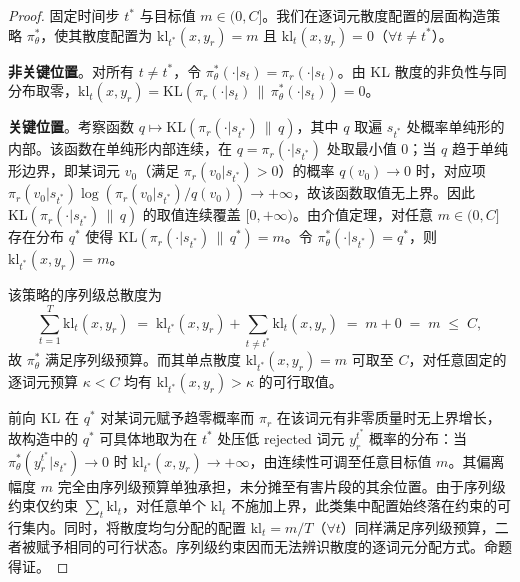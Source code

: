 \documentclass[lettersize,journal]{IEEEtran}
\begin{document}
\begin{proof}
固定时间步 $t^*$ 与目标值 $m \in (0, C]$。我们在逐词元散度配置的层面构造策略 $\pi_\theta^*$，使其散度配置为 $\mathrm{kl}_{t^*}(x, y_r) = m$ 且 $\mathrm{kl}_t(x, y_r) = 0$（$\forall t \neq t^*$）。
 
\textbf{非关键位置}。对所有 $t \neq t^*$，令 $\pi_\theta^*(\cdot|s_t) = \pi_r(\cdot|s_t)$。由 KL 散度的非负性与同分布取零，$\mathrm{kl}_t(x, y_r) = \mathrm{KL}(\pi_r(\cdot|s_t) \,\|\, \pi_\theta^*(\cdot|s_t)) = 0$。
 
\textbf{关键位置}。考察函数 $q \mapsto \mathrm{KL}(\pi_r(\cdot|s_{t^*}) \,\|\, q)$，其中 $q$ 取遍 $s_{t^*}$ 处概率单纯形的内部。该函数在单纯形内部连续，在 $q = \pi_r(\cdot|s_{t^*})$ 处取最小值 $0$；当 $q$ 趋于单纯形边界，即某词元 $v_0$（满足 $\pi_r(v_0|s_{t^*}) > 0$）的概率 $q(v_0) \to 0$ 时，对应项 $\pi_r(v_0|s_{t^*})\log(\pi_r(v_0|s_{t^*})/q(v_0)) \to +\infty$，故该函数取值无上界。因此 $\mathrm{KL}(\pi_r(\cdot|s_{t^*}) \,\|\, q)$ 的取值连续覆盖 $[0, +\infty)$。由介值定理，对任意 $m \in (0, C]$ 存在分布 $q^*$ 使得 $\mathrm{KL}(\pi_r(\cdot|s_{t^*}) \,\|\, q^*) = m$。令 $\pi_\theta^*(\cdot|s_{t^*}) = q^*$，则 $\mathrm{kl}_{t^*}(x, y_r) = m$。
 
该策略的序列级总散度为
\begin{equation}
\sum_{t=1}^{T} \mathrm{kl}_t(x, y_r) \;=\; \mathrm{kl}_{t^*}(x, y_r) + \sum_{t \neq t^*} \mathrm{kl}_t(x, y_r) \;=\; m + 0 \;=\; m \;\le\; C,
\end{equation}
故 $\pi_\theta^*$ 满足序列级预算。而其单点散度 $\mathrm{kl}_{t^*}(x, y_r) = m$ 可取至 $C$，对任意固定的逐词元预算 $\kappa < C$ 均有 $\mathrm{kl}_{t^*}(x, y_r) > \kappa$ 的可行取值。
 
前向 KL 在 $q^*$ 对某词元赋予趋零概率而 $\pi_r$ 在该词元有非零质量时无上界增长，故构造中的 $q^*$ 可具体地取为在 $t^*$ 处压低 rejected 词元 $y_r^{t^*}$ 概率的分布：当 $\pi_\theta^*(y_r^{t^*}|s_{t^*}) \to 0$ 时 $\mathrm{kl}_{t^*}(x, y_r) \to +\infty$，由连续性可调至任意目标值 $m$。其偏离幅度 $m$ 完全由序列级预算单独承担，未分摊至有害片段的其余位置。由于序列级约束仅约束 $\sum_t \mathrm{kl}_t$，对任意单个 $\mathrm{kl}_t$ 不施加上界，此类集中配置始终落在约束的可行集内。同时，将散度均匀分配的配置 $\mathrm{kl}_t = m/T$（$\forall t$）同样满足序列级预算，二者被赋予相同的可行状态。序列级约束因而无法辨识散度的逐词元分配方式。命题得证。
\end{proof}
\end{document}
